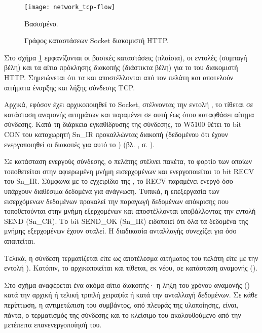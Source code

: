 \begin{figure}
    \caption{Γράφος καταστάσεων Socket διακομιστή HTTP.
    \label{fig:network:tcp-flow}}
    \begin{center}
    \texttt{[image: network\_tcp-flow]}
    \end{center}
    Βασισμένο. 
\end{figure}

Στο σχήμα \ref{fig:network:tcp-flow} εμφανίζονται οι βασικές καταστάσεις
(πλαίσια), οι εντολές (συμπαγή βέλη) και τα αίτια πρόκλησης διακοπής (διάστικτα
βέλη) για το  του διακομιστή HTTP. Σημειώνεται ότι τα 
και  αποστέλλονται από τον πελάτη και αποτελούν αιτήματα
έναρξης και λήξης σύνδεσης TCP.

Αρχικά, εφόσον έχει αρχικοποιηθεί το Socket, στέλνοντας την εντολή ,
το  τίθεται σε κατάσταση αναμονής αιτημάτων και παραμένει σε αυτή έως
ότου
καταφθάσει αίτημα σύνδεσης. Κατά τη διάρκεια εγκαθίδρυσης της σύνδεσης, το W5100
θέτει το bit CON του καταχωρητή Sn\_IR προκαλλώντας διακοπή (δεδομένου ότι έχουν
ενεργοποιηθεί οι διακοπές για αυτό το ) (βλ.
, σ. \pageref{ssubsec:network:ir_imr}).

Σε κατάσταση ενεργούς σύνδεσης, ο πελάτης στέλνει πακέτα, το φορτίο των οποίων
τοποθετείται στην αφιερωμένη μνήμη εισερχομένων και ενεργοποιείται το bit RECV
του Sn\_IR. Σύμφωνα με το εγχειρίδιο της \textcite[28]{wiz11:w5100}, το RECV
παραμένει ενεργό όσο υπάρχουν διαθέσιμα δεδομένα για ανάγνωση. Τυπικά, η
επεξεργασία των εισερχόμενων δεδομένων προκαλεί την παραγωγή δεδομένων απόκρισης
που τοποθετούνται στην μνήμη εξερχομένων και αποστέλλονται υποβάλλοντας την
εντολή SEND (Sn\_CR). Το bit SEND\_OK (Sn\_IR) ειδοποιεί ότι όλα τα δεδομένα της
μνήμης εξερχομένων έχουν σταλεί. Η διαδικασία ανταλλαγής συνεχίζει για όσο
απαιτείται.

Τελικά, η σύνδεση τερματίζεται είτε ως αποτέλεσμα αιτήματος του πελάτη είτε με
την εντολή ). Κατόπιν, το  αρχικοποιείται και τίθεται, εκ
νέου, σε κατάσταση αναμονής ().

Στο σχήμα αναφέρεται ένα ακόμα αίτιο διακοπής· η λήξη του χρόνου αναμονής
() κατά την αρχική ή τελική τριπλή χειραψία ή κατά την ανταλλαγή
δεδομένων. Σε κάθε περίπτωση, η αντιμετώπιση του συμβάντος, από πλευράς της
υλοποίησης, είναι, πάντα, ο τερματισμός της σύνδεσης και το κλείσιμο του
 ακολουθούμενο από την μετέπειτα επανενεργοποίησή του.

